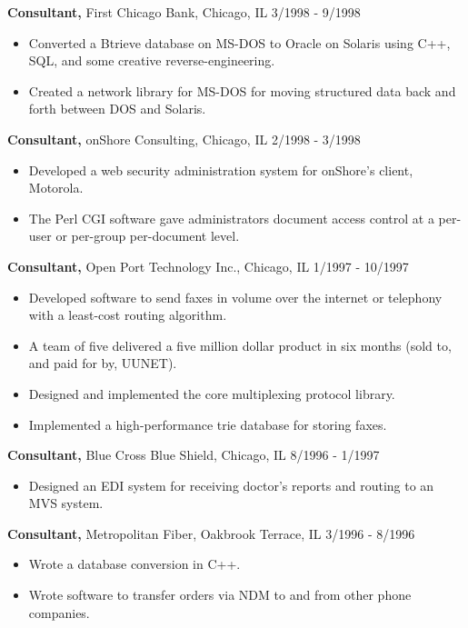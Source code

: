 \documentclass[margin]{res}
\begin{document}
\begin{resume}
 {\bf Consultant,} First Chicago Bank, Chicago, IL \hfill 3/1998 - 9/1998
\begin{itemize} \itemsep -2pt 
\item Converted a Btrieve database on MS-DOS to Oracle on Solaris using C++, SQL, and some creative reverse-engineering.
\item Created a network library for MS-DOS for moving structured data back and forth between DOS and Solaris.
\end{itemize}


{\bf Consultant,} onShore Consulting, Chicago, IL \hfill 2/1998 - 3/1998
\begin{itemize} \itemsep -2pt 
\item Developed a web security administration system for onShore's client, Motorola.
\item The Perl CGI software gave administrators document access control at a per-user or per-group per-document level.
\end{itemize}

{\bf Consultant,} Open Port Technology Inc., Chicago, IL \hfill 1/1997 - 10/1997
\begin{itemize} \itemsep -2pt 
\item Developed software to send faxes in volume over the internet or telephony with a least-cost routing algorithm.
\item A team of five delivered a five million dollar product in six months (sold to, and paid for by, UUNET).
\item Designed and implemented the core multiplexing protocol library.
\item Implemented a high-performance trie database for storing faxes.
\end{itemize}

{\bf Consultant,} Blue Cross Blue Shield, Chicago, IL \hfill 8/1996 - 1/1997
\begin{itemize} \itemsep -2pt 
\item Designed an EDI system for receiving doctor's reports and routing to an MVS system.
\end{itemize}

{\bf Consultant,} Metropolitan Fiber, Oakbrook Terrace, IL \hfill 3/1996 - 8/1996
\begin{itemize} \itemsep -2pt 
\item Wrote a database conversion in C++.
\item Wrote software to transfer orders via NDM to and from other phone companies.
\end{itemize}


\end{resume}
\end{document}
